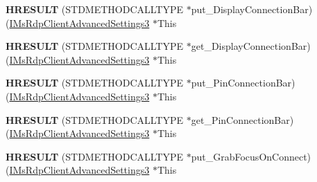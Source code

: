 \begin{DoxyCompactItemize}
\item 
\mbox{\label{struct_m_s_t_s_c_lib_1_1_i_ms_rdp_client_advanced_settings3_vtbl_a81a1b42281f16eb1e4d71f406bdc592c}} 
{\bfseries H\+R\+E\+S\+U\+LT} (S\+T\+D\+M\+E\+T\+H\+O\+D\+C\+A\+L\+L\+T\+Y\+PE $\ast$put\+\_\+\+Display\+Connection\+Bar)(\hyperlink{interface_m_s_t_s_c_lib_1_1_i_ms_rdp_client_advanced_settings3}{I\+Ms\+Rdp\+Client\+Advanced\+Settings3} $\ast$This
\item 
\mbox{\label{struct_m_s_t_s_c_lib_1_1_i_ms_rdp_client_advanced_settings3_vtbl_a5f59f582d80b8890e7259e785110b742}} 
{\bfseries H\+R\+E\+S\+U\+LT} (S\+T\+D\+M\+E\+T\+H\+O\+D\+C\+A\+L\+L\+T\+Y\+PE $\ast$get\+\_\+\+Display\+Connection\+Bar)(\hyperlink{interface_m_s_t_s_c_lib_1_1_i_ms_rdp_client_advanced_settings3}{I\+Ms\+Rdp\+Client\+Advanced\+Settings3} $\ast$This
\item 
\mbox{\label{struct_m_s_t_s_c_lib_1_1_i_ms_rdp_client_advanced_settings3_vtbl_a30b1424dcec05e2028544f05e961c8c1}} 
{\bfseries H\+R\+E\+S\+U\+LT} (S\+T\+D\+M\+E\+T\+H\+O\+D\+C\+A\+L\+L\+T\+Y\+PE $\ast$put\+\_\+\+Pin\+Connection\+Bar)(\hyperlink{interface_m_s_t_s_c_lib_1_1_i_ms_rdp_client_advanced_settings3}{I\+Ms\+Rdp\+Client\+Advanced\+Settings3} $\ast$This
\item 
\mbox{\label{struct_m_s_t_s_c_lib_1_1_i_ms_rdp_client_advanced_settings3_vtbl_a6e05bca31f4ee4f08743d57fe60bde32}} 
{\bfseries H\+R\+E\+S\+U\+LT} (S\+T\+D\+M\+E\+T\+H\+O\+D\+C\+A\+L\+L\+T\+Y\+PE $\ast$get\+\_\+\+Pin\+Connection\+Bar)(\hyperlink{interface_m_s_t_s_c_lib_1_1_i_ms_rdp_client_advanced_settings3}{I\+Ms\+Rdp\+Client\+Advanced\+Settings3} $\ast$This
\item 
\mbox{\label{struct_m_s_t_s_c_lib_1_1_i_ms_rdp_client_advanced_settings3_vtbl_aba5b22ed53ea39318e1c33560728f798}} 
{\bfseries H\+R\+E\+S\+U\+LT} (S\+T\+D\+M\+E\+T\+H\+O\+D\+C\+A\+L\+L\+T\+Y\+PE $\ast$put\+\_\+\+Grab\+Focus\+On\+Connect)(\hyperlink{interface_m_s_t_s_c_lib_1_1_i_ms_rdp_client_advanced_settings3}{I\+Ms\+Rdp\+Client\+Advanced\+Settings3} $\ast$This

\end{DoxyCompactItemize}
